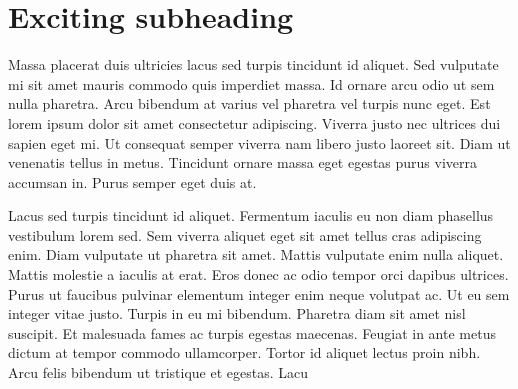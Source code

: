 \section*{Exciting subheading}

Massa placerat duis ultricies lacus sed turpis tincidunt id aliquet. Sed vulputate mi sit amet mauris commodo quis imperdiet massa. Id ornare arcu odio ut sem nulla pharetra. Arcu bibendum at varius vel pharetra vel turpis nunc eget. Est lorem ipsum dolor sit amet consectetur adipiscing. Viverra justo nec ultrices dui sapien eget mi. Ut consequat semper viverra nam libero justo laoreet sit. Diam ut venenatis tellus in metus. Tincidunt ornare massa eget egestas purus viverra accumsan in. Purus semper eget duis at.

Lacus sed turpis tincidunt id aliquet. Fermentum iaculis eu non diam phasellus vestibulum lorem sed. Sem viverra aliquet eget sit amet tellus cras adipiscing enim. Diam vulputate ut pharetra sit amet. Mattis vulputate enim nulla aliquet. Mattis molestie a iaculis at erat. Eros donec ac odio tempor orci dapibus ultrices. Purus ut faucibus pulvinar elementum integer enim neque volutpat ac. Ut eu sem integer vitae justo. Turpis in eu mi bibendum. Pharetra diam sit amet nisl suscipit. Et malesuada fames ac turpis egestas maecenas. Feugiat in ante metus dictum at tempor commodo ullamcorper. Tortor id aliquet lectus proin nibh. Arcu felis bibendum ut tristique et egestas. Lacu

